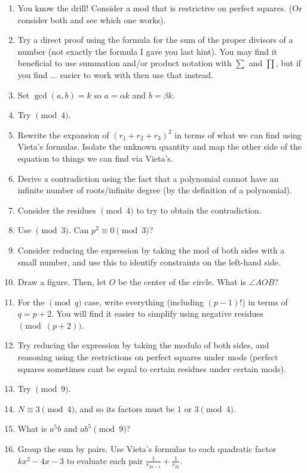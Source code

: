 \begin{enumerate}[label=\textbf{H\arabic*.}]
    \item You know the drill! Consider a mod that is restrictive on perfect squares. (Or consider both and see which one works).
    \item Try a direct proof using the formula for the sum of the proper divisors of a number (not exactly the formula I gave you last hint). You may find it beneficial to use summation and/or product notation with $\sum$ and $\prod$, but if you find $\ldots$ easier to work with then use that instead.
    \item Set $\gcd(a, b) = k$ so $a = \alpha k$ and $b = \beta k$.
    \item Try $\pmod{4}$.
    \item Rewrite the expansion of $(r_1 + r_2 + r_3)^2$ in terms of what we can find using Vieta's formulas. Isolate the unknown quantity and map the other side of the equation to things we can find via Vieta's. 
    \item Derive a contradiction using the fact that a polynomial cannot have an infinite number of roots/infinite degree (by the definition of a polynomial). 
    \item Consider the residues $\pmod{4}$ to try to obtain the contradiction.
    \item Use $\pmod{3}$. Can $p^2 \equiv 0 \pmod{3}$?
    \item Consider reducing the expression by taking the mod of both sides with a small number, and use this to identify constraints on the left-hand side.
    \item Draw a figure. Then, let $O$ be the center of the circle. What is $\angle AOB$?
    \item For the $\pmod{q}$ case, write everything (including $(p-1)!$) in terms of $q = p+2$. You will find it easier to simplify using negative residues $\pmod{(p+2)}$. 
    \item Try reducing the expression by taking the modulo of both sides, and reasoning using the restrictions on perfect squares under mods (perfect squares sometimes cant be equal to certain residues under certain mods).
    \item Try $\pmod{9}$.
    \item $N \equiv 3 \pmod{4}$, and so its factors must be $1$ or $3 \pmod{4}$. 
    \item What is $a^5b$ and $ab^5 \pmod{9}$?
    \item Group the sum by pairs. Use Vieta's formulas to each quadratic factor $kx^2 - 4x - 3$ to evaluate each pair $\frac{1}{r_{2k-1}} + \frac{1}{r_{2k}}$. 

\end{enumerate}
